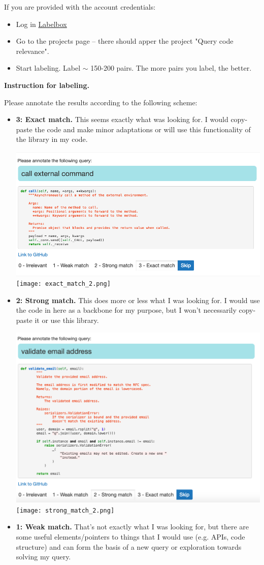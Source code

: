 \documentclass[12 pt]{article}
\begin{document}
If you are provided with the account credentials:
\begin{itemize}
	\item Log in \href{https://labelbox.com}{Labelbox}
	\item Go to the projects page -- there should apper the project "Query code relevance".
	\item Start labeling. Label $\sim$ 150-200 pairs. The more pairs you label, the better.
\end{itemize}


{\bf \Large Instruction for labeling. } 

Please annotate the results according to the following scheme:
\begin{itemize}
	\item {\bf 3: Exact match.} This seems exactly what was looking for. I would copy-paste the code and make minor adaptations or will use this functionality of the library in my code. 

	\includegraphics[width=\textwidth]{exact_match.png}
	\texttt{[image: exact\_match\_2.png]}
	\item {\bf 2: Strong match.} This does more or less what I was looking for. I would use the code in here as a backbone for my purpose, but I won't necessarily copy-paste it or use this library.

	\includegraphics[width=\textwidth]{strong_match}
	\texttt{[image: strong\_match\_2.png]}
	\item {\bf 1: Weak match.} That's not exactly what I was looking for, but there are some useful elements/pointers to things that I would use (e.g. APIs, code structure) and can form the basis of a new query or exploration towards solving my query.


\end{itemize}
\end{document}
